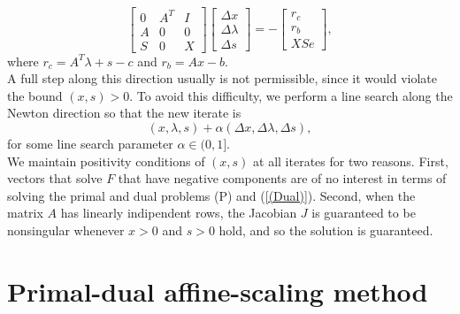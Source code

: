 \documentclass[a4paper,10 pt,titlepage,twoside]{book}
\theoremstyle{plain}
\theoremstyle{definition}
\theoremstyle{remark}
\begin{document}
\begin{equation}\label{(5.1)}
	\begin{bmatrix}
0&A^{T}&I \\A&0&0\\S&0&X
	\end{bmatrix}\begin{bmatrix}
	\Delta x\\\Delta\lambda \\\Delta s
	\end{bmatrix}=-\begin{bmatrix}
	r_{c}\\r_{b}\\XSe
	\end{bmatrix},
\end{equation}
where $r_{c}= A^{T}\lambda+s-c$ and $r_{b}= Ax-b$.\\
A full step along this direction usually is not permissible, since it would violate the bound $(x,s)>0$. To avoid this difficulty, we perform a line search along the Newton direction so that the new iterate is
\begin{equation*}
	(x,\lambda,s) +\alpha (\Delta x,\Delta \lambda,\Delta s),
\end{equation*} 
for some line search parameter $\alpha \in (0,1]$. \\We maintain positivity conditions of $(x,s)$ at all iterates for two reasons. First, vectors that solve $\mathit{F}$ that have negative components are of no interest in terms of solving the primal and dual problems (P) and (\ref{(Dual)}). Second, when the matrix $A$ has linearly indipendent rows, the Jacobian $J$ is guaranteed to be nonsingular whenever $x>0$ and $s>0$ hold, and so the solution is guaranteed.

\section{Primal-dual affine-scaling method}
\end{document}
